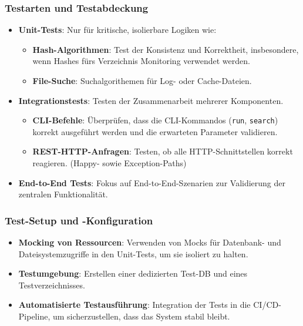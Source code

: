 \documentclass[a4paper,12pt]{report}
\begin{document}
    \subsubsection{Testarten und Testabdeckung}
    \begin{itemize}
        \item \textbf{Unit-Tests}: Nur für kritische, isolierbare Logiken wie:
        \begin{itemize}
            \item \textbf{Hash-Algorithmen}: Test der Konsistenz und Korrektheit, insbesondere, wenn Hashes fürs Verzeichnis Monitoring verwendet werden.
            \item \textbf{File-Suche}: Suchalgorithemen für Log- oder Cache-Dateien.
        \end{itemize}
        \item \textbf{Integrationstests}: Testen der Zusammenarbeit mehrerer Komponenten.
        \begin{itemize}
            \item \textbf{CLI-Befehle}: Überprüfen, dass die CLI-Kommandos (\texttt{run}, \texttt{search}) korrekt ausgeführt werden und die erwarteten Parameter validieren.
            \item \textbf{REST-HTTP-Anfragen}: Testen, ob alle HTTP-Schnittstellen korrekt reagieren. (Happy- sowie Exception-Paths)
        \end{itemize}
        \item \textbf{End-to-End Tests}: Fokus auf End-to-End-Szenarien zur Validierung der zentralen Funktionalität.
    \end{itemize}

    \subsubsection{Test-Setup und -Konfiguration}
    \begin{itemize}
        \item \textbf{Mocking von Ressourcen}: Verwenden von Mocks für Datenbank- und Dateisystemzugriffe in den Unit-Tests, um sie isoliert zu halten.
        \item \textbf{Testumgebung}: Erstellen einer dedizierten Test-DB und eines Testverzeichnisses.
        \item \textbf{Automatisierte Testausführung}: Integration der Tests in die CI/CD-Pipeline, um sicherzustellen, dass das System stabil bleibt.
    \end{itemize}
\end{document}
